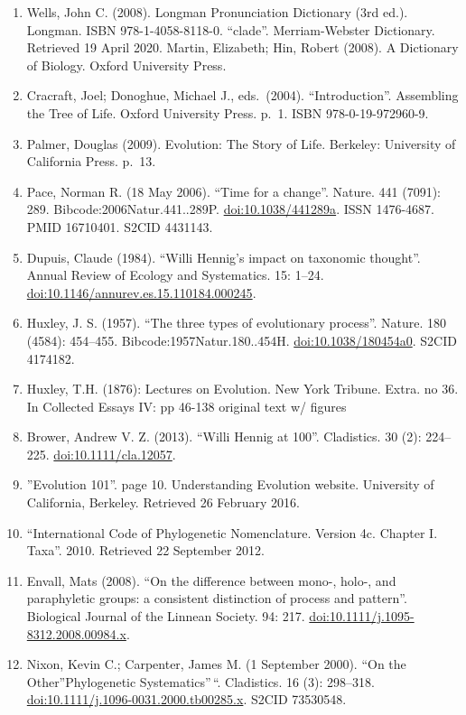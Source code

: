 \documentclass[
]{book}
\providecommand{\tightlist}{%
  \setlength{\itemsep}{0pt}\setlength{\parskip}{0pt}}
\begin{document}
\begin{enumerate}
\def\labelenumi{\arabic{enumi}.}
\tightlist
\item
  Wells, John C. (2008). Longman Pronunciation Dictionary (3rd ed.). Longman. ISBN 978-1-4058-8118-0. ``clade''. Merriam-Webster Dictionary. Retrieved 19 April 2020.
  Martin, Elizabeth; Hin, Robert (2008). A Dictionary of Biology. Oxford University Press.
\item
  Cracraft, Joel; Donoghue, Michael J., eds.~(2004). ``Introduction''. Assembling the Tree of Life. Oxford University Press. p.~1. ISBN 978-0-19-972960-9.
\item
  Palmer, Douglas (2009). Evolution: The Story of Life. Berkeley: University of California Press. p.~13.
\item
  Pace, Norman R. (18 May 2006). ``Time for a change''. Nature. 441 (7091): 289. Bibcode:2006Natur.441..289P. \url{doi:10.1038/441289a}. ISSN 1476-4687. PMID 16710401. S2CID 4431143.
\item
  Dupuis, Claude (1984). ``Willi Hennig's impact on taxonomic thought''. Annual Review of Ecology and Systematics. 15: 1--24. \url{doi:10.1146/annurev.es.15.110184.000245}.
\item
  Huxley, J. S. (1957). ``The three types of evolutionary process''. Nature. 180 (4584): 454--455. Bibcode:1957Natur.180..454H. \url{doi:10.1038/180454a0}. S2CID 4174182.
\item
  Huxley, T.H. (1876): Lectures on Evolution. New York Tribune. Extra. no 36. In Collected Essays IV: pp 46-138 original text w/ figures
\item
  Brower, Andrew V. Z. (2013). ``Willi Hennig at 100''. Cladistics. 30 (2): 224--225. \url{doi:10.1111/cla.12057}.
\item
  ''Evolution 101''. page 10. Understanding Evolution website. University of California, Berkeley. Retrieved 26 February 2016.
\item
  ``International Code of Phylogenetic Nomenclature. Version 4c. Chapter I. Taxa''. 2010. Retrieved 22 September 2012.
\item
  Envall, Mats (2008). ``On the difference between mono-, holo-, and paraphyletic groups: a consistent distinction of process and pattern''. Biological Journal of the Linnean Society. 94: 217. \url{doi:10.1111/j.1095-8312.2008.00984.x}.
\item
  Nixon, Kevin C.; Carpenter, James M. (1 September 2000). ``On the Other''Phylogenetic Systematics''\,``. Cladistics. 16 (3): 298--318. \url{doi:10.1111/j.1096-0031.2000.tb00285.x}. S2CID 73530548.
\end{enumerate}
\end{document}
